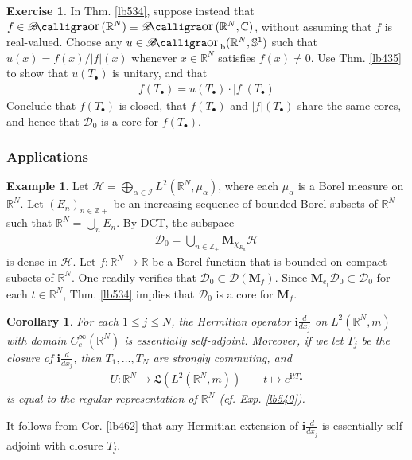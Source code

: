\documentclass[12pt,b5paper,notitlepage]{article}
\theoremstyle{definition}
\newtheorem{eg}[df]{Example}
\newtheorem{exe}[df]{Exercise}
\theoremstyle{plain}
\newtheorem{co}[df]{Corollary}
\DeclareMathOperator{\Bor}{\mathscr{B}\text{\kern -2pt {\calligra\large or}}\,}
\DeclareMathOperator{\Borb}{{\mathscr{B}\text{\kern -2pt {\calligra\large or}}\,}_{\mathrm b}}
\newcommand{\fk}{\mathfrak}
\newcommand{\Dom}{\mathscr{D}}
\newcommand{\im}{\mathbf{i}}
\newcommand{\blt}{\bullet}
\newcommand{\Cbb}{\mathbb C}
\newcommand{\Zbb}{\mathbb Z}
\newcommand{\Rbb}{\mathbb R}
\newcommand{\Sbb}{{\mathbb S}}
\newcommand{\MH}{\mathcal H}
\newcommand{\SI}{\mathscr I}
\newcommand{\Mbf}{\mathbf M}
\numberwithin{equation}{section}
\begin{document}
\begin{exe}
In Thm. \ref{lb534}, suppose instead that $f\in\Bor(\Rbb^N)\equiv\Bor(\Rbb^N,\Cbb)$, without assuming that $f$ is real-valued. Choose any $u\in\Borb(\Rbb^N,\Sbb^1)$ such that $u(x)=f(x)/|f|(x)$ whenever $x\in\Rbb^N$ satisfies $f(x)\neq0$. Use Thm. \ref{lb435} to show that $u(T_\blt)$ is unitary, and that
\begin{align}
f(T_\blt)=u(T_\blt)\cdot|f|(T_\blt)
\end{align}
Conclude that $f(T_\blt)$ is closed, that $f(T_\blt)$ and $|f|(T_\blt)$ share the same cores, and hence that $\Dom_0$ is a core for $f(T_\blt)$.
\end{exe}



\subsubsection{Applications}

\begin{eg}
Let $\MH=\bigoplus_{\alpha\in\SI}L^2(\Rbb^N,\mu_\alpha)$, where each $\mu_\alpha$ is a Borel measure on $\Rbb^N$. Let $(E_n)_{n\in\Zbb+}$ be an increasing sequence of bounded Borel subsets of $\Rbb^N$ such that $\Rbb^N = \bigcup_n E_n$. By DCT, the subspace
\begin{align*}
\Dom_0=\bigcup_{n\in\Zbb_+}\Mbf_{\chi_{E_n}}\MH
\end{align*}
is dense in $\MH$. Let $f:\Rbb^N\rightarrow\Rbb$ be a Borel function that is bounded on compact subsets of $\Rbb^N$. One readily verifies that $\Dom_0\subset\Dom(\Mbf_f)$. Since $\Mbf_{e_t}\Dom_0\subset\Dom_0$ for each $t\in\Rbb^N$, Thm. \ref{lb534} implies that $\Dom_0$ is a core for $\Mbf_f$.
\end{eg}



\begin{co}\label{lb541}
For each $1\leq j\leq N$, the Hermitian operator $\im\frac d{dx_j}$ on $L^2(\Rbb^N,m)$ with domain $C_c^\infty(\Rbb^N)$ is essentially self-adjoint. Moreover, if we let $T_j$ be the closure of $\im\frac d{dx_j}$, then $T_1,\dots,T_N$ are strongly commuting, and
\begin{align*}
U:\Rbb^N\rightarrow\fk L(L^2(\Rbb^N,m))\qquad t\mapsto e^{\im tT_\blt}
\end{align*} 
is equal to the regular representation of $\Rbb^N$ (cf. Exp. \ref{lb540}).
\end{co}

It follows from Cor. \ref{lb462} that any Hermitian extension of $\im\frac d{dx_j}$ is essentially self-adjoint with closure $T_j$.
\end{document}
